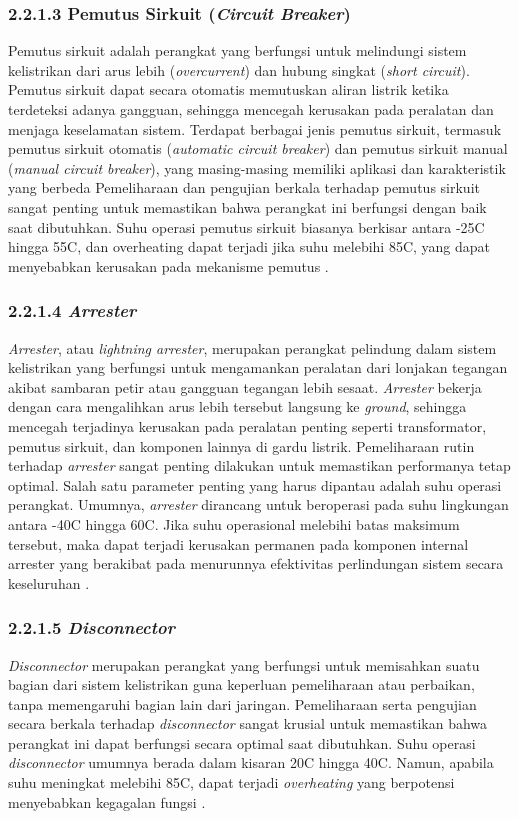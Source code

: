 \subsubsection{2.2.1.3 Pemutus Sirkuit (\emph{Circuit Breaker})}
Pemutus sirkuit adalah perangkat yang berfungsi untuk melindungi sistem kelistrikan dari arus lebih (\emph{overcurrent}) dan hubung singkat (\emph{short circuit}). Pemutus sirkuit dapat secara otomatis memutuskan aliran listrik ketika terdeteksi adanya gangguan, sehingga mencegah kerusakan pada peralatan dan menjaga keselamatan sistem. Terdapat berbagai jenis pemutus sirkuit, termasuk pemutus sirkuit otomatis (\emph{automatic circuit breaker}) dan pemutus sirkuit manual (\emph{manual circuit breaker}), yang masing-masing memiliki aplikasi dan karakteristik yang berbeda Pemeliharaan dan pengujian berkala terhadap pemutus sirkuit sangat penting untuk memastikan bahwa perangkat ini berfungsi dengan baik saat dibutuhkan. Suhu operasi pemutus sirkuit biasanya berkisar antara -25\textdegree{}C hingga 55\textdegree{}C, dan overheating dapat terjadi jika suhu melebihi 85\textdegree{}C, yang dapat menyebabkan kerusakan pada mekanisme pemutus \cite{Ilomets2020}.


\subsubsection{2.2.1.4 \emph{Arrester}}
\emph{Arrester}, atau \emph{lightning arrester}, merupakan perangkat pelindung dalam sistem kelistrikan yang berfungsi untuk mengamankan peralatan dari lonjakan tegangan akibat sambaran petir atau gangguan tegangan lebih sesaat. \emph{Arrester} bekerja dengan cara mengalihkan arus lebih tersebut langsung ke \emph{ground}, sehingga mencegah terjadinya kerusakan pada peralatan penting seperti transformator, pemutus sirkuit, dan komponen lainnya di gardu listrik. Pemeliharaan rutin terhadap \emph{arrester} sangat penting dilakukan untuk memastikan performanya tetap optimal. Salah satu parameter penting yang harus dipantau adalah suhu operasi perangkat. Umumnya, \emph{arrester} dirancang untuk beroperasi pada suhu lingkungan antara -40\textdegree{}C hingga 60\textdegree{}C. Jika suhu operasional melebihi batas maksimum tersebut, maka dapat terjadi kerusakan permanen pada komponen internal arrester yang berakibat pada menurunnya efektivitas perlindungan sistem secara keseluruhan \cite{Kartika2022}.

\subsubsection{2.2.1.5 \emph{Disconnector}}
\emph{Disconnector} merupakan perangkat yang berfungsi untuk memisahkan suatu bagian dari sistem kelistrikan guna keperluan pemeliharaan atau perbaikan, tanpa memengaruhi bagian lain dari jaringan. Pemeliharaan serta pengujian secara berkala terhadap \emph{disconnector} sangat krusial untuk memastikan bahwa perangkat ini dapat berfungsi secara optimal saat dibutuhkan. Suhu operasi \emph{disconnector} umumnya berada dalam kisaran 20\textdegree{}C hingga 40\textdegree{}C. Namun, apabila suhu meningkat melebihi 85\textdegree{}C, dapat terjadi \emph{overheating} yang berpotensi menyebabkan kegagalan fungsi \cite{Henriana2022}.


